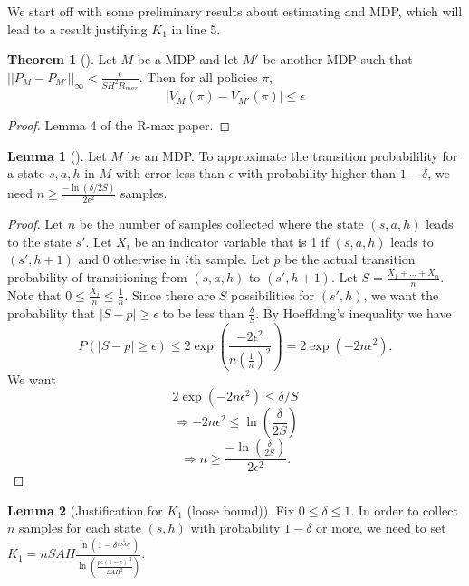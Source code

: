 \documentclass[12pt, letterpaper]{article}
\theoremstyle{definition}
\newtheorem*{thm}{Theorem}
\newtheorem*{lemma}{Lemma}
\theoremstyle{remark}
\begin{document}
We start off with some preliminary results about estimating and MDP, which will lead to a result justifying \(K_1\) in line 5.

\begin{thm}[]
    Let \(M\) be a MDP and let \(M'\) be another MDP such that \(||P_{M} - P_{M'}||_{\infty} < \frac{\epsilon}{SH^2R_{max}}\). Then for all policies \(\pi\),
    \[|V_{M}(\pi) - V_{M'}(\pi)| \leq \epsilon\]
\end{thm}

\begin{proof}[Proof]
    Lemma 4 of the R-max paper.
\end{proof}

\begin{lemma}[]
    Let \(M\) be an MDP. To approximate the transition probabilility for a state \(s, a, h\) in \(M\) with error less than \(\epsilon\) with probability higher than \(1 - \delta\), we need \(n \geq \frac{-\ln(\delta/2S)}{2\epsilon^2}\) samples.
\end{lemma}

\begin{proof}[Proof]
    Let \(n\) be the number of samples collected where the state \((s, a, h)\) leads to the state \(s'\). Let \(X_i\) be an indicator variable that is 1 if \((s, a, h)\) leads to \((s', h+1)\) and 0 otherwise in \(i\)th sample. Let \(p\) be the actual transition probability of transitioning from \((s, a, h)\) to \((s', h+1)\). Let \(S = \frac{X_1 + \ldots + X_{n}}{n}\). Note that \(0 \leq \frac{X_i}{n} \leq \frac{1}{n}\). Since there are \(S\) possibilities for \((s', h)\), we want the probability that \(|S - p| \geq \epsilon\) to be less than \(\frac{\delta}{S}\). By Hoeffding's inequality we have
    \[P(|S - p| \geq \epsilon) \leq 2 \exp (\frac{-2\epsilon^{2}}{n(\frac{1}{n})^2}) = 2 \exp(-2n\epsilon^2).\]
    We want
    \[2 \exp(-2n\epsilon^2) \leq \delta/S\]
    \[\Rightarrow -2n\epsilon^2 \leq \ln(\frac{\delta}{2S})\]
    \[\Rightarrow n \geq \frac{-\ln(\frac{\delta}{2S})}{2\epsilon^2}.\]
\end{proof}


\begin{lemma}[Justification for \(K_1\) (loose bound)]
    Fix \(0 \leq \delta \leq 1\). In order to collect \(n\) samples for each state \((s, h)\) with probability \(1-\delta\) or more, we need to set \(K_1 = nSAH \frac{\ln(1 - \delta^{\frac{1}{nSAH}})}{\ln(\frac{p\epsilon (1-\epsilon)^{H}}{SAH^2})}\).
\end{lemma}
\end{document}
